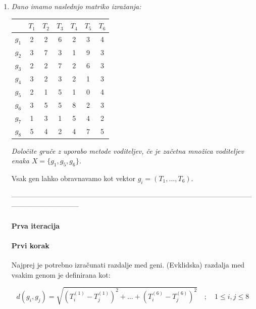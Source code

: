 \documentclass{article}
\begin{document}
\begin{enumerate}
		\newpage

	\item \textit{Dano imamo naslednjo matriko izražanja:}

		\begin{center}
			\begin{tabular}{c||c|c|c|c|c|c|}
				& $T_1$ & $T_2$ & $T_3$ & $T_4$ & $T_5$ & $T_6$ \\
				\hline
				\hline
				$g_1$ & 2 & 2 & 6 & 2 & 3 & 4 \\
				\hline
				$g_2$ & 3 & 7 & 3 & 1 & 9 & 3 \\
				\hline
				$g_3$ & 2 & 2 & 7 & 2 & 6 & 3 \\
				\hline
				$g_4$ & 3 & 2 & 3 & 2 & 1 & 3 \\
				\hline
				$g_5$ & 2 & 1 & 5 & 1 & 0 & 4 \\
				\hline
				$g_6$ & 3 & 5 & 5 & 8 & 2 & 3 \\
				\hline
				$g_7$ & 1 & 3 & 1 & 5 & 4 & 2 \\
				\hline
				$g_8$ & 5 & 4 & 2 & 4 & 7 & 5
			\end{tabular}
		\end{center}

		\textit{Določite gruče z uporabo metode voditeljev, če je začetna množica voditeljev
		enaka $X = \{g_1, g_5, g_6\}$.}

		Vsak gen lahko obravnavamo kot vektor $g_i = (T_1, \dots, T_6)$.

		-----------------------------------------------------------------------------------------------------------------------------------

			\begin{center}
				\paragraph{Prva iteracija}
			\end{center}

		\paragraph{Prvi korak} Najprej je potrebno izračunati razdalje med geni.
		(Evklidska) razdalja med vsakim genom je definirana kot:

		\begin{equation}
			d(g_i, g_j) = \sqrt{ \left(T_{i}^{(1)} - T_{j}^{(1)} \right)^2 + \dots + \left(T_{i}^{(6)} - T_{j}^{(6)} \right)^2 } \quad ; \quad 1 \leq i,j \leq 8
		\end{equation}


\end{enumerate}
\end{document}
